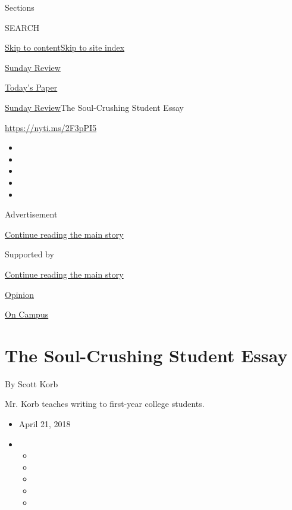 Sections

SEARCH

\protect\hyperlink{site-content}{Skip to
content}\protect\hyperlink{site-index}{Skip to site index}

\href{https://www.nytimes3xbfgragh.onion/section/opinion/sunday}{Sunday
Review}

\href{https://myaccount.nytimes3xbfgragh.onion/auth/login?response_type=cookie\&client_id=vi}{}

\href{https://www.nytimes3xbfgragh.onion/section/todayspaper}{Today's
Paper}

\href{/section/opinion/sunday}{Sunday Review}\textbar{}The Soul-Crushing
Student Essay

\url{https://nyti.ms/2F3pPI5}

\begin{itemize}
\item
\item
\item
\item
\item
\end{itemize}

Advertisement

\protect\hyperlink{after-top}{Continue reading the main story}

Supported by

\protect\hyperlink{after-sponsor}{Continue reading the main story}

\href{/section/opinion}{Opinion}

\href{/column/on-campus}{On Campus}

\hypertarget{the-soul-crushing-student-essay}{%
\section{The Soul-Crushing Student
Essay}\label{the-soul-crushing-student-essay}}

By Scott Korb

Mr. Korb teaches writing to first-year college students.

\begin{itemize}
\item
  April 21, 2018
\item
  \begin{itemize}
  \item
  \item
  \item
  \item
  \item
  \end{itemize}
\end{itemize}

